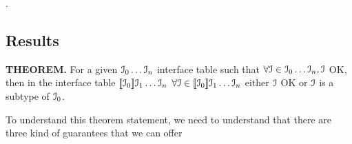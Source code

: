.




\subsection{Results}
\textbf{THEOREM. }
For a given ${\cal{I}}_0\ldots{\cal{I}}_n$ interface table such that
$\forall{\cal{I}}\in{\cal{I}}_0\ldots{\cal{I}}_n, {\cal{I}}$ OK, then in the interface table
$[\![{\cal{I}}_0]\!]{\cal{I}}_1\ldots{\cal{I}}_n$
$\forall{\cal{I}}\in[\![{\cal{I}}_0]\!]{\cal{I}}_1\ldots{\cal{I}}_n$ either ${\cal{I}}$ OK or ${\cal{I}}$ is a subtype of ${\cal{I}}_0$.

To understand this theorem statement, we need to understand that there are three kind of guarantees that we can offer
\\

